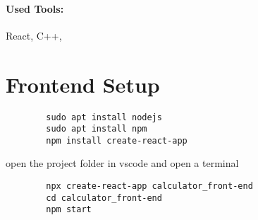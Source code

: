 \documentclass{article}
\begin{document}
	
	\paragraph{Used Tools:} React, C++,
	
	\section{Frontend Setup}
	\begin{verbatim}
		sudo apt install nodejs
		sudo apt install npm
		npm install create-react-app 
	\end{verbatim}
	open the project folder in vscode and open a terminal
	\begin{verbatim}
		npx create-react-app calculator_front-end
		cd calculator_front-end
		npm start
	\end{verbatim}
	
\end{document}
